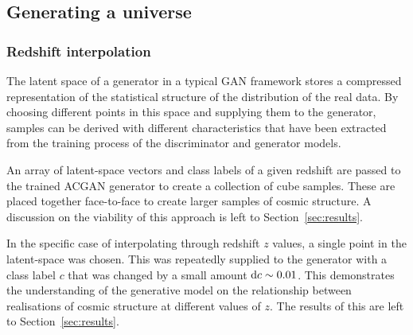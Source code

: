 \documentclass[twocolumn]{article}
\numberwithin{equation}{section}
\begin{document}

\subsection{Generating a universe}


\subsubsection{Redshift interpolation}\label{methods:z_interp}
The latent space of a generator in a typical GAN framework stores a compressed representation of the statistical structure
of the distribution of the real data. By choosing different points in this space and supplying them to the generator, 
samples can be derived with different characteristics that have been extracted from the training process of the 
discriminator and generator models.

An array of latent-space vectors and class labels of a given redshift are passed to the trained ACGAN generator to create
a collection of cube samples. These are placed together face-to-face to create larger samples of cosmic structure. A 
discussion on the viability of this approach is left to Section~\ref{sec:results}.

In the specific case of interpolating through redshift $z$ values, a single point in the latent-space was chosen. This was 
repeatedly supplied to the generator with a class label $c$ that was changed by a small amount $\textup{d}c \sim 0.01$. 
This demonstrates the understanding of the generative model on the relationship between realisations of cosmic structure 
at different values of $z$. The results of this are left to Section~\ref{sec:results}.
\end{document}
